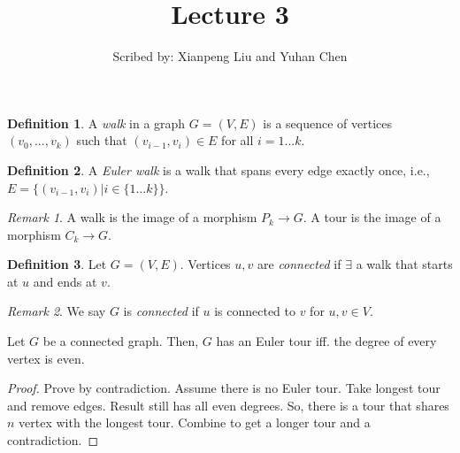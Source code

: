 \documentclass{article}
\theoremstyle{definition}
\newtheorem{definition}{Definition}
\theoremstyle{example}
\theoremstyle{remark}
\newtheorem*{remark}{Remark}
\begin{document}
  \title{Lecture 3}
  \author{Scribed by: Xianpeng Liu and Yuhan Chen}
  \maketitle




  \begin{definition}
    A \textit{walk} in a graph $G=(V,E)$ is a sequence of vertices $(v_{0},...,v_{k})$ such that $(v_{i-1},v_{i})\in E$ for all $i=1...k$.
  \end{definition}

  \begin{definition}
    A \textit{Euler walk} is a walk that spans every edge exactly once, i.e., $E=\{(v_{i-1},v_{i}) |  i\in \{1...k\}\}$.
  \end{definition}

  \begin{remark}
  A walk is the image of a morphism $P_{k}\to G$. A tour is the image of a morphism $C_{k}\to G$.
  \end{remark}

  \begin{definition}
    Let $G=(V,E)$. Vertices $u,v$ are \textit{connected} if $\exists$ a walk that starts at $u$ and ends at $v$.
  \end{definition}

  \begin{remark}
  We say $G$ is \textit{connected} if $u$ is connected to $v$ for $u,v \in V$.
  \end{remark}


  \begin{theorem}
    Let $G$ be a connected graph. Then, $G$ has an Euler tour iff. the degree of every vertex is even.
  \end{theorem}
  \begin{proof}
    Prove by contradiction. Assume there is no Euler tour. Take longest tour and remove edges. Result still has all even degrees. So, there is a tour that shares $n$ vertex with the longest tour. Combine to get a longer tour and a contradiction.
  \end{proof}
\end{document}
